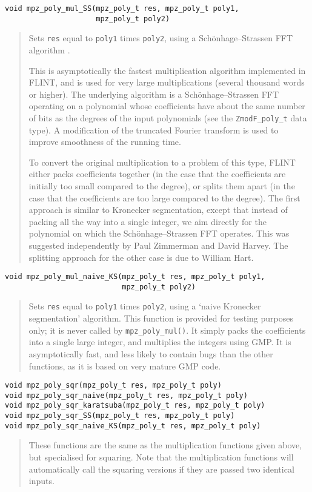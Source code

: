 \documentclass[a4paper,10pt]{article}
\newcommand{\code}{\lstinline}
\begin{document}
\begin{lstlisting}
void mpz_poly_mul_SS(mpz_poly_t res, mpz_poly_t poly1,
                     mpz_poly_t poly2)
\end{lstlisting}
\begin{quote}
Sets \code{res} equal to \code{poly1} times \code{poly2}, using a Sch\"onhage--Strassen FFT algorithm \cite{ss}.

This is asymptotically the fastest multiplication algorithm implemented in FLINT, and is used for very large multiplications (several thousand words or higher). The underlying algorithm is a Sch\"onhage--Strassen FFT operating on a polynomial whose coefficients have about the same number of bits as the degrees of the input polynomials (see the \code{ZmodF_poly_t} data type). A modification of the truncated Fourier transform \cite{tft} is used to improve smoothness of the running time.

To convert the original multiplication to a problem of this type, FLINT either packs coefficients together (in the case that the coefficients are initially too small compared to the degree), or splits them apart (in the case that the coefficients are too large compared to the degree). The first approach is similar to Kronecker segmentation, except that instead of packing all the way into a single integer, we aim directly for the polynomial on which the Sch\"onhage--Strassen FFT operates. This was suggested independently by Paul Zimmerman and David Harvey. The splitting approach for the other case is due to William Hart.
\end{quote}


\begin{lstlisting}
void mpz_poly_mul_naive_KS(mpz_poly_t res, mpz_poly_t poly1,
                           mpz_poly_t poly2)
\end{lstlisting}
\begin{quote}
Sets \code{res} equal to \code{poly1} times \code{poly2}, using a `naive Kronecker segmentation' algorithm. This function is provided for testing purposes only; it is never called by \code{mpz_poly_mul()}. It simply packs the coefficients into a single large integer, and multiplies the integers using GMP. It is asymptotically fast, and less likely to contain bugs than the other functions, as it is based on very mature GMP code.
\end{quote}



\begin{lstlisting}
void mpz_poly_sqr(mpz_poly_t res, mpz_poly_t poly)
void mpz_poly_sqr_naive(mpz_poly_t res, mpz_poly_t poly)
void mpz_poly_sqr_karatsuba(mpz_poly_t res, mpz_poly_t poly)
void mpz_poly_sqr_SS(mpz_poly_t res, mpz_poly_t poly)
void mpz_poly_sqr_naive_KS(mpz_poly_t res, mpz_poly_t poly)
\end{lstlisting}
\begin{quote}
These functions are the same as the multiplication functions given above, but specialised for squaring. Note that the multiplication functions will automatically call the squaring versions if they are passed two identical inputs.
\end{quote}
\end{document}
